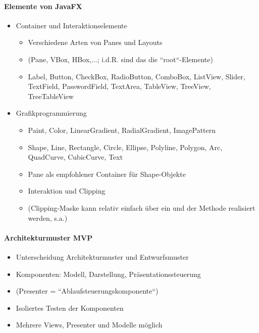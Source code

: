 \paragraph*{Elemente von JavaFX}

\begin{itemize}
    \item Container und Interaktionselemente
    \begin{itemize}
        \item Verschiedene Arten von Panes und Layouts
        \item[](Pane, VBox, HBox,...; i.d.R. sind das die ``root``-Elemente)
        \item Label, Button, CheckBox, RadioButton, ComboBox, ListView, Slider, TextField, PasswordField, TextArea, TableView, TreeView, TreeTableView
    \end{itemize}
    \item Grafikprogrammierung
    \begin{itemize}
        \item Paint, Color, LinearGradient, RadialGradient, ImagePattern
        \item Shape, Line, Rectangle, Circle, Ellipse, Polyline, Polygon, Arc, QuadCurve, CubicCurve, Text
        \item Pane als empfohlener Container für Shape-Objekte
        \item Interaktion und Clipping
        \item[] (Clipping-Maske kann relativ einfach über ein  und der Methode  realisiert werden, s.a.\cite[222]{Oec22})
    \end{itemize}
\end{itemize}

\paragraph*{Architekturmuster MVP}

\begin{itemize}
    \item Unterscheidung Architekturmuster und Entwurfsmuster
    \item Komponenten: Modell, Darstellung, Präsentationssteuerung
    \item[] (Presenter = ``Ablaufsteuerungskomponente``)
    \item Isoliertes Testen der Komponenten
    \item Mehrere Views, Presenter und Modelle möglich
\end{itemize}

